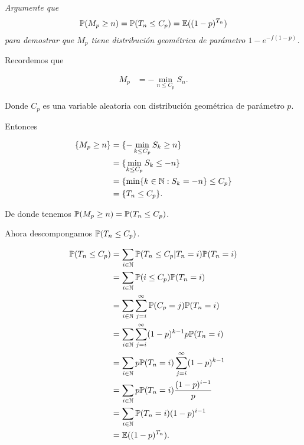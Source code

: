 \emph{
    Argumente que
    \null
    \begin{align}
        \mathbb{P}(M_p\geq n)=\mathbb{P}(T_n\leq C_p)=\mathbb{E}((1-p)^{T_n})
    \end{align}
    \null
    para demostrar que $M_p$ tiene distribuci\'on geom\'etrica de par\'ametro $1-e^{-f(1-p)}$.
}

\afterstatement\par\null

    Recordemos que
    
    \begin{align}
        M_p     &=  -\min_{n\leq C_p} S_n. 
    \end{align}\par\null
    
    Donde $C_p$ es una variable aleatoria con distribución geométrica de parámetro $p$.\par\null
    
    Entonces 
    
    \begin{align}
        \{ M_p \geq n\}     &=  \{ -\min_{k\leq C_p} S_k \geq n \}          \\
                            &=  \{ \min_{k \leq C_p} S_k \leq -n \}         \\
                            &=  \{ \min\{ k \in \mathbb{N} : S_k = -n \}\leq C_p \}   \\
                            &=  \{ T_n \leq C_p \}.
    \end{align}\par\null
    
    De donde tenemos $\mathbb{P}(M_p\geq n)=\mathbb{P}(T_n\leq C_p)$.\par\null
    
    Ahora descompongamos $\mathbb{P}(T_n \leq C_p)$.
    
    \begin{align}
        \mathbb{P}(T_n \leq C_p)   &=  \sum_{i \in \mathbb{N}} \mathbb{P}(T_n \leq C_p | T_n = i) \mathbb{P}(T_n = i)        \\
                            &=  \sum_{i \in \mathbb{N}} \mathbb{P}(i \leq C_p) \mathbb{P}(T_n = i)                    \\
                            &=  \sum_{i \in \mathbb{N}} \sum_{j = i}^{\infty} \mathbb{P}(C_p = j) \mathbb{P}(T_n = i) \\
                            &=  \sum_{i \in \mathbb{N}} \sum_{j = i}^{\infty} (1-p)^{k-1} p\mathbb{P}(T_n = i) \\
                            &=  \sum_{i \in \mathbb{N}} p\mathbb{P}(T_n = i) \sum_{j = i}^{\infty} (1-p)^{k-1} \\                            
                            &=  \sum_{i \in \mathbb{N}} p\mathbb{P}(T_n = i) \frac{(1-p)^{i-1}}{p}             \\                            
                            &=  \sum_{i \in \mathbb{N}} \mathbb{P}(T_n = i) (1-p)^{i-1}                        \\                     
                            &=  \mathbb{E}((1-p)^{T_n}).                                                            
    \end{align}\par\null
    
